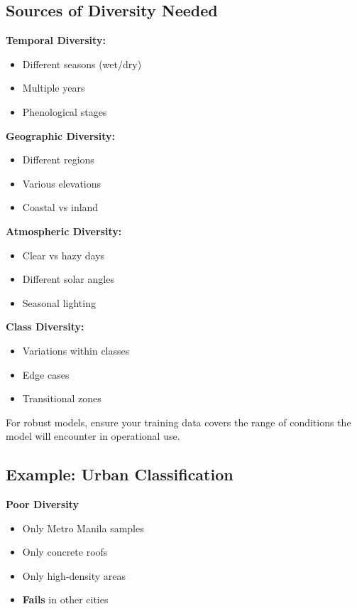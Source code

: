 \documentclass[
  letterpaper,
  DIV=11,
  numbers=noendperiod]{scrartcl}
\providecommand{\tightlist}{%
  \setlength{\itemsep}{0pt}\setlength{\parskip}{0pt}}
\begin{document}
\subsection{Sources of Diversity
Needed}\label{sources-of-diversity-needed}

\textbf{Temporal Diversity:}

\begin{itemize}
\tightlist
\item
  Different seasons (wet/dry)
\item
  Multiple years
\item
  Phenological stages
\end{itemize}

\textbf{Geographic Diversity:}

\begin{itemize}
\tightlist
\item
  Different regions
\item
  Various elevations
\item
  Coastal vs inland
\end{itemize}

\textbf{Atmospheric Diversity:}

\begin{itemize}
\tightlist
\item
  Clear vs hazy days
\item
  Different solar angles
\item
  Seasonal lighting
\end{itemize}

\textbf{Class Diversity:}

\begin{itemize}
\tightlist
\item
  Variations within classes
\item
  Edge cases
\item
  Transitional zones
\end{itemize}

For robust models, ensure your training data covers the range of
conditions the model will encounter in operational use.

\subsection{Example: Urban
Classification}\label{example-urban-classification}

\textbf{Poor Diversity}

\begin{itemize}
\tightlist
\item
  Only Metro Manila samples
\item
  Only concrete roofs
\item
  Only high-density areas
\item
  \textbf{Fails} in other cities
\end{itemize}
\end{document}
